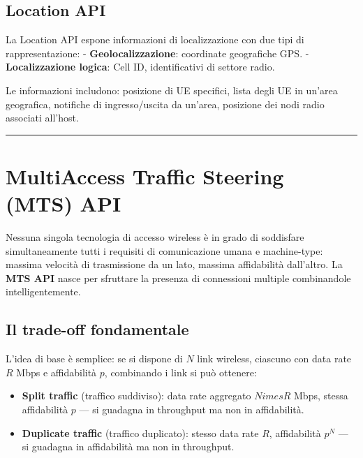 \documentclass[
  italian,
  openany]{book}
\providecommand{\tightlist}{%
  \setlength{\itemsep}{0pt}\setlength{\parskip}{0pt}}
\begin{document}
\subsection{Location API}\label{location-api}

La Location API espone informazioni di localizzazione con due tipi di
rappresentazione: - \textbf{Geolocalizzazione}: coordinate geografiche
GPS. - \textbf{Localizzazione logica}: Cell ID, identificativi di
settore radio.

Le informazioni includono: posizione di UE specifici, lista degli UE in
un'area geografica, notifiche di ingresso/uscita da un'area, posizione
dei nodi radio associati all'host.

\begin{center}\rule{0.5\linewidth}{0.5pt}\end{center}

\section{MultiAccess Traffic Steering (MTS)
API}\label{multiaccess-traffic-steering-mts-api}

Nessuna singola tecnologia di accesso wireless è in grado di soddisfare
simultaneamente tutti i requisiti di comunicazione umana e machine-type:
massima velocità di trasmissione da un lato, massima affidabilità
dall'altro. La \textbf{MTS API} nasce per sfruttare la presenza di
connessioni multiple combinandole intelligentemente.

\subsection{Il trade-off fondamentale}\label{il-trade-off-fondamentale}

L'idea di base è semplice: se si dispone di \(N\) link wireless,
ciascuno con data rate \(R\) Mbps e affidabilità \(p\), combinando i
link si può ottenere:

\begin{itemize}
\tightlist
\item
  \textbf{Split traffic} (traffico suddiviso): data rate aggregato
  \(N    imes R\) Mbps, stessa affidabilità \(p\) --- si guadagna in
  throughput ma non in affidabilità.
\item
  \textbf{Duplicate traffic} (traffico duplicato): stesso data rate
  \(R\), affidabilità \(p^N\) --- si guadagna in affidabilità ma non in
  throughput.
\end{itemize}
\end{document}
